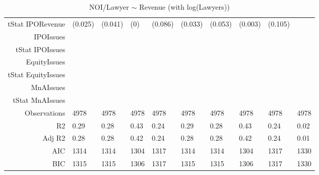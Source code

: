 \begin{table}[ht]
\begin{tabular}{rlllllllll}
  tStat IPORevenue & (0.025) & (0.041) & (0) & (0.086) & (0.033) & (0.053) & (0.003) & (0.105) &  \\ 
  IPOIssues &  &  &  &  &  &  &  &  &  \\ 
  tStat IPOIssues &  &  &  &  &  &  &  &  &  \\ 
  EquityIssues &  &  &  &  &  &  &  &  &  \\ 
  tStat EquityIssues &  &  &  &  &  &  &  &  &  \\ 
  MnAIssues &  &  &  &  &  &  &  &  &  \\ 
  tStat MnAIssues &  &  &  &  &  &  &  &  &  \\ 
  Observations & 4978 & 4978 & 4978 & 4978 & 4978 & 4978 & 4978 & 4978 & 4978 \\ 
  R2 & 0.29 & 0.28 & 0.43 & 0.24 & 0.29 & 0.28 & 0.43 & 0.24 & 0.02 \\ 
  Adj R2 & 0.28 & 0.28 & 0.42 & 0.24 & 0.28 & 0.28 & 0.42 & 0.24 & 0.01 \\ 
  AIC & 1314 & 1314 & 1304 & 1317 & 1314 & 1314 & 1304 & 1317 & 1330 \\ 
  BIC & 1315 & 1315 & 1306 & 1317 & 1315 & 1315 & 1306 & 1317 & 1330 \\ 
   \hline
\end{tabular}
\caption{NOI/Lawyer $\sim$ Revenue (with log(Lawyers))} 
\end{table}
